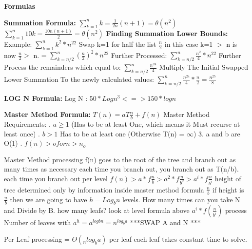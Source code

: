 \documentclass{article}
\begin{document}
\begin{flushleft}
\center\textbf{Formulas}

\begin{flushleft}
\vspace{8mm}\textbf{Summation Formula:}\newline
$\displaystyle\sum_{k=1}^{n} k = \frac{1}{2n}(n+1) = \theta(n^2)$
\newline$\displaystyle\sum_{k=1}^{n} 10k = \frac{10n(n+1)}{2} = \theta(n^2)$
\newline \textbf{Finding Summation Lower Bounds:} 
\newline Example: $\displaystyle\sum_{k=1}^{n} k^2 *n^{22}$
\newline Swap k=1 for half the list $\frac{n}{2}$ in this case k=1 $>$ n is now $\frac{n}{2} >$ n. =  $\displaystyle\sum_{k=n/2}^{n} (\frac{n}{2})^2 *n^{22}$
\newline Further Processed: $\displaystyle\sum_{k=n/2}^{n} \frac{n^2}{4} *n^{22}$
\newline Further Process the remainders which equal to: $\displaystyle\sum_{k=n/2}^{n} \frac{n^{24}}{4}$
\newline Multiply The Initial Swapped Lower Summation To the newly calculated values: 
$\displaystyle\sum_{k=n/2}^{n} \frac{n^{24}}{4} * \frac{n}{2} = \frac{n^{25}}{8}$

\vspace{8mm}\textbf{LOG N Formula:}
Log N : $50 * Log n^3 <=> 150 * logn$ \newline

\textbf{Master Method Formula:} $T(n) = aT\frac{n}{b} + f(n)$
\newline Master Method Requirements: . $a \geq 1$ (Has to be at least One, which means it Must recurse at least once)
. $b > 1$ Has to be at least one (Otherwise T(n) = $\infty$)
3. a and b are O(1)
. $f(n) > o for n>n_o$

Master Method processing
f(n) goes to the root of the tree and branch out as many times as necessary
\newline each time you branch out, you branch out as T(n/b). 
\newline each time you branch out per level $f(n) > a*f\frac{n}{b} > a^2 * f\frac{n}{b^2} > a^i*f\frac{n}{b^i}$  
height of tree determined only by information inside master method formula $\frac{n}{b}$
if height is $\frac{n}{b}$ then we are going to have $h=Log_bn$ levels. How many times can you take N and Divide by B. 
how many leafs?
look at level formula above $a^i * f(\frac{n}{b^i})$
process Number of leaves with $a^h = a^{logbn} = n^{log_ba}$ ***SWAP A and N ***

Per Leaf processing = $\Theta(_nlog_ba)$ per leaf
\newline each leaf takes constant time to solve. 



\end{flushleft}
\end{flushleft}
\end{document}
